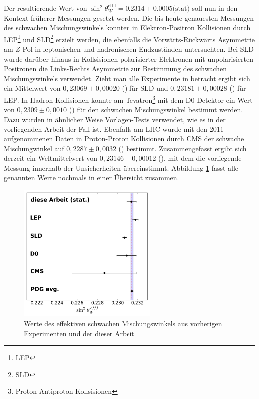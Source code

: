 Der resultierende Wert von $\sin^2\theta_W^\text{eff,l}=0.2314\pm0.0005
\text{(stat)}$ soll nun in den Kontext früherer Messungen gesetzt werden. Die
bis heute genauesten Messungen des schwachen Mischungswinkels konnten in
Elektron-Positron Kollisionen durch LEP\footnote{\acf{LEP}} und
SLD\footnote{\acf{SLD}} erzielt werden, die ebenfalls die Vorwärts-Rückwärts
Asymmetrie am $Z$-Pol in leptonischen und hadronischen Endzuständen
untersuchten. Bei \ac{SLD} wurde darüber hinaus in Kollsisionen polarisierter
Elektronen mit unpolarisierten Positronen die Links-Rechts Asymmetrie zur
Bestimmung des schwachen Mischungswinkels verwendet. Zieht man alle Experimente
in betracht ergibt sich ein Mittelwert von $0,23069\pm0,00020$
(\cite{PhysRevD.86.010001}) für \ac{SLD} und $0,23181\pm0,00028$
(\cite{PhysRevD.86.010001}) für \ac{LEP}. In Hadron-Kollisionen konnte am
Tevatron\footnote{Proton-Antiproton Kollsisionen} mit dem D0-Detektor ein Wert
von $0,2309\pm0,0010$ (\cite{Abazov:2011ws}) für den schwachen Mischungswinkel
bestimmt werden. Dazu wurden in ähnlicher Weise Vorlagen-Tests verwendet, wie
es in der vorliegenden Arbeit der Fall ist. Ebenfalls am \ac{LHC} wurde mit den
2011 aufgenommenen Daten in Proton-Proton Kollisionen durch \acs{CMS} der
schwache Mischungwinkel auf $0,2287\pm0,0032$ (\cite{Chatrchyan:2011ya})
bestimmt. Zusammengefasst ergibt sich derzeit ein Weltmittelwert von
$0,23146\pm0,00012$ (\cite{PhysRevD.86.010001}), mit dem die vorliegende
Messung innerhalb der Unsicherheiten übereinstimmt. Abbildung
\ref{fig:results_comparison} fasst alle genannten Werte nochmals in einer
Übersicht zusammen.

\begin{figure}[h]
    \centering
    \includegraphics[width=0.6\textwidth]{plots/sin2theta_comparison}
    \caption[Werte des effektiven schwachen Mischungswinkels aus vorherigen
        Experimenten]
        {Werte des effektiven schwachen Mischungswinkels aus vorherigen
        Experimenten und der dieser Arbeit}
    \label{fig:results_comparison}
\end{figure}

